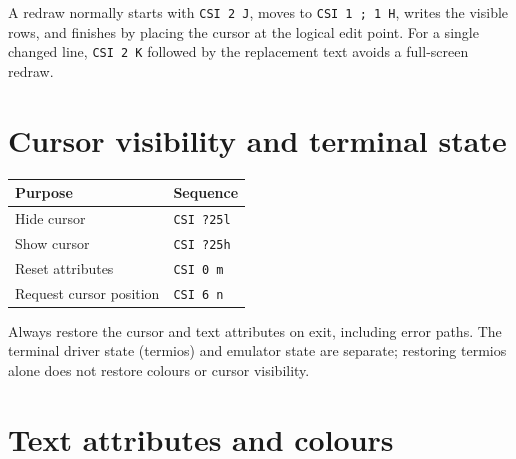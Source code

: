 \documentclass[
  oneside,
  openany]{book}
\begin{document}
A redraw normally starts with \texttt{CSI\ 2\ J}, moves to
\texttt{CSI\ 1\ ;\ 1\ H}, writes the visible rows, and finishes by
placing the cursor at the logical edit point. For a single changed line,
\texttt{CSI\ 2\ K} followed by the replacement text avoids a full-screen
redraw.

\hypertarget{cursor-visibility-and-terminal-state}{%
\section{Cursor visibility and terminal
state}\label{cursor-visibility-and-terminal-state}}

\begin{longtable}[]{@{}ll@{}}
\toprule\noalign{}
Purpose & Sequence \\
\midrule\noalign{}
\endhead
\bottomrule\noalign{}
\endlastfoot
Hide cursor & \texttt{CSI\ ?25l} \\
Show cursor & \texttt{CSI\ ?25h} \\
Reset attributes & \texttt{CSI\ 0\ m} \\
Request cursor position & \texttt{CSI\ 6\ n} \\
\end{longtable}

Always restore the cursor and text attributes on exit, including error
paths. The terminal driver state (termios) and emulator state are
separate; restoring termios alone does not restore colours or cursor
visibility.

\hypertarget{text-attributes-and-colours}{%
\section{Text attributes and
colours}\label{text-attributes-and-colours}}
\end{document}
